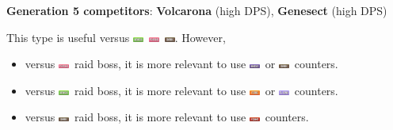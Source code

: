 \documentclass[8pt,aspectratio=169,compress]{beamer}
\newcommand{\fightingfull}{\includegraphics[height=0.15cm]{../../images/type/full/Fighting.png}}
\newcommand{\darkfull}{\includegraphics[height=0.15cm]{../../images/type/full/Dark.png}}
\newcommand{\firefull}{\includegraphics[height=0.15cm]{../../images/type/full/Fire.png}}
\newcommand{\flyingfull}{\includegraphics[height=0.15cm]{../../images/type/full/Flying.png}}
\newcommand{\ghostfull}{\includegraphics[height=0.15cm]{../../images/type/full/Ghost.png}}
\newcommand{\grassfull}{\includegraphics[height=0.15cm]{../../images/type/full/Grass.png}}
\newcommand{\psychicfull}{\includegraphics[height=0.15cm]{../../images/type/full/Psychic.png}}
\begin{document}
\begin{frame}
\begin{tiny}
\begin{block}{}
\begin{center}
\textbf{Generation 5 competitors}: \textbf{Volcarona} (high DPS), \textbf{Genesect} (high DPS)
\end{center}
\end{block}

\begin{block}{}
\begin{center}
This type is useful versus \grassfull~\psychicfull~\darkfull. However, 
\begin{itemize}
\item versus \psychicfull~raid boss, it is more relevant to use \ghostfull~or \darkfull~counters.
\item versus \grassfull~raid boss, it is more relevant to use \firefull~or \flyingfull~counters.
\item versus \darkfull~raid boss, it is more relevant to use \fightingfull~counters.
\end{itemize}
\end{center}
\end{block}

\end{tiny}
\end{frame}



\end{document}
